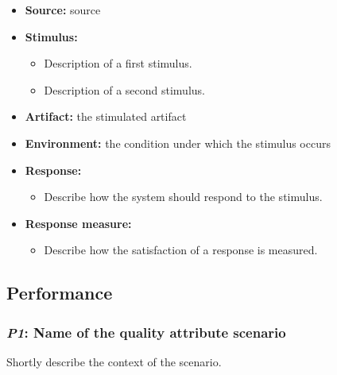 \documentclass[a4paper,10pt]{article}
\begin{document}
\begin{itemize}
    \item \textbf{Source:} source
    \item \textbf{Stimulus:}
        \begin{itemize}
            \item Description of a first stimulus.
            \item Description of a second stimulus.
        \end{itemize}

    \item \textbf{Artifact:} the stimulated artifact
    \item \textbf{Environment:} the condition under which the stimulus occurs
    \item \textbf{Response:}
        \begin{itemize}
            \item Describe how the system should respond to the stimulus.
        \end{itemize}

    \item \textbf{Response measure:}
        \begin{itemize}
            \item Describe how the satisfaction of a response is measured.
        \end{itemize}
\end{itemize}

\subsection{Performance}
\subsubsection{\emph{P1}: Name of the quality attribute scenario}
Shortly describe the context of the scenario.
\end{document}
